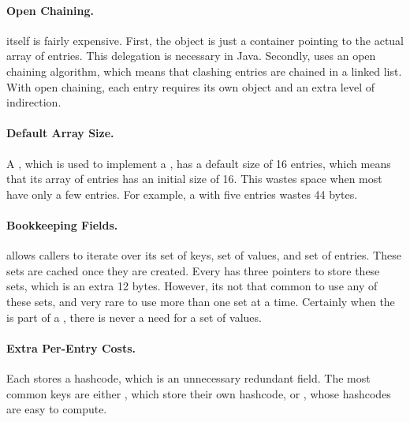 \paragraph{Open Chaining.}  itself is fairly
 expensive. First, the  object is just a container pointing
 to the actual array of entries. This delegation is necessary in Java.
 Secondly,  uses an
 open chaining algorithm, which means that clashing entries are chained in a
 linked list. With open chaining, each entry requires its own
  object and an extra level of indirection.
 
\paragraph{Default Array Size.} 
A , which is used to implement a , has a default
size of 16 entries, which means that its array of entries has an initial
size of 16. This wastes space when most  have only a few
entries. For example, a  with five entries wastes 44 bytes.


\paragraph{Bookkeeping Fields.}  allows callers to iterate over
its set of keys, set of values, and set of entries. These sets are cached once
they are created. Every  has three pointers
to store these sets, which is an extra 12 bytes.
However, its not that common to use
any of these sets, and very rare to use more than one set at a time.
 Certainly when the  is part of a , 
there is never a need for a set of values.
  
 \paragraph{Extra Per-Entry Costs.} Each  stores a
 hashcode, which is an unnecessary redundant field. The most common keys are either
 , which store their own hashcode, or , whose
 hashcodes are easy to compute. 

